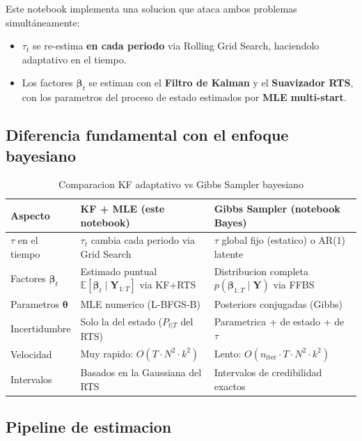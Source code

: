 \documentclass[12pt, a4paper]{article}
\theoremstyle{plain}
\theoremstyle{definition}
\theoremstyle{remark}
\newcommand{\bbet}{\bm{\beta}}
\newcommand{\bY}{\mathbf{Y}}
\newcommand{\E}[1]{\mathbb{E}\!\left[#1\right]}
\begin{document}
Este notebook implementa una solucion que ataca ambos problemas
simultáneamente:

\begin{itemize}[leftmargin=1.5em]
  \item $\tau_t$ se re-estima \textbf{en cada periodo} via Rolling Grid Search,
        haciendolo adaptativo en el tiempo.
  \item Los factores $\bbet_t$ se estiman con el \textbf{Filtro de Kalman}
        y el \textbf{Suavizador RTS}, con los parametros del proceso de estado
        estimados por \textbf{MLE multi-start}.
\end{itemize}

\subsection{Diferencia fundamental con el enfoque bayesiano}

\begin{table}[H]
\centering
\caption{Comparacion KF adaptativo vs Gibbs Sampler bayesiano}
\label{tab:kf_vs_bayes}
\small
\begin{tabular}{L{3.5cm} L{5.5cm} L{5.0cm}}
\toprule
\textbf{Aspecto}
  & \textbf{KF + MLE (este notebook)}
  & \textbf{Gibbs Sampler (notebook Bayes)} \\
\midrule
$\tau$ en el tiempo
  & $\tau_t$ cambia cada periodo via Grid Search
  & $\tau$ global fijo (estatico) o AR(1) latente \\
\addlinespace
Factores $\bbet_t$
  & Estimado puntual $\E{\bbet_t \mid \bY_{1:T}}$ via KF+RTS
  & Distribucion completa $p(\bbet_{1:T} \mid \bY)$ via FFBS \\
\addlinespace
Parametros $\bm{\theta}$
  & MLE numerico (L-BFGS-B)
  & Posteriors conjugadas (Gibbs) \\
\addlinespace
Incertidumbre
  & Solo la del estado ($P_{t|T}$ del RTS)
  & Parametrica + de estado + de $\tau$ \\
\addlinespace
Velocidad
  & Muy rapido: $O(T \cdot N^2 \cdot k^2)$
  & Lento: $O(n_\text{iter} \cdot T \cdot N^2 \cdot k^2)$ \\
\addlinespace
Intervalos
  & Basados en la Gaussiana del RTS
  & Intervalos de credibilidad exactos \\
\bottomrule
\end{tabular}
\end{table}

\subsection{Pipeline de estimacion}
\end{document}
